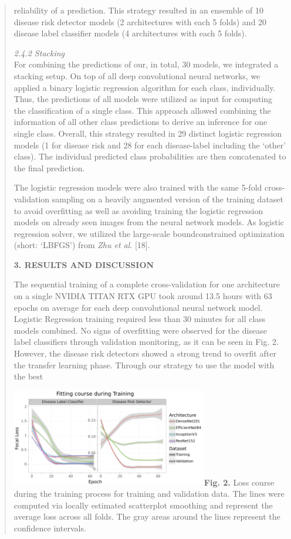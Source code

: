 \documentclass[
]{article}
\begin{document}
\begin{quote}
reliability of a prediction. This strategy resulted in an ensemble of 10
disease risk detector models (2 architectures with each 5 folds) and 20
disease label classifier models (4 architectures with each 5 folds).

\emph{2.4.2 Stacking}\\
For combining the predictions of our, in total, 30 models, we integrated
a stacking setup. On top of all deep convolutional neural networks, we
applied a binary logistic regression algorithm for each class,
individually. Thus, the predictions of all models were utilized as input
for computing the classification of a single class. This approach
allowed combining the information of all other class predictions to
derive an inference for one single class. Overall, this strategy
resulted in 29 distinct logistic regression models (1 for disease risk
and 28 for each disease-label including the `other' class). The
individual predicted class probabilities are then concatenated to the
final prediction.

The logistic regression models were also trained with the same 5-fold
cross-validation sampling on a heavily augmented version of the training
dataset to avoid overfitting as well as avoiding training the logistic
regression models on already seen images from the neural network models.
As logistic regression solver, we utilized the large-scale
boundconstrained optimization (short: `LBFGS') from \emph{Zhu et al}.
{[}18{]}.

\textbf{3. RESULTS AND DISCUSSION}

The sequential training of a complete cross-validation for one
architecture on a single NVIDIA TITAN RTX GPU took around 13.5 hours
with 63 epochs on average for each deep convolutional neural network
model. Logistic Regression training required less than 30 minutes for
all class models combined. No signs of overfitting were observed for the
disease label classifiers through validation monitoring, as it can be
seen in Fig. 2. However, the disease risk detectors showed a strong
trend to overfit after the transfer learning phase. Through our strategy
to use the model with the best

\includegraphics[width=3.375in,height=1.68472in]{vertopal_2f1cfafaf78f44c9b64931ec8d4445e5/media/image2.png}\textbf{Fig.
2.} Loss course during the training process for training and validation
data. The lines were computed via locally estimated scatterplot
smoothing and represent the average loss across all folds. The gray
areas around the lines represent the confidence intervals.


\end{quote}
\end{document}
